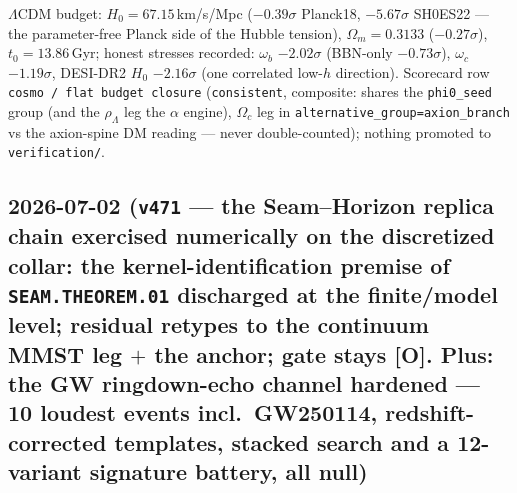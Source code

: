 \documentclass[11pt]{article}
\providecommand{\mO}{\textbf{[O]}}\providecommand{\mX}{\textbf{[X]}}
\begin{document}
\begin{itemize}[leftmargin=1.5em]
$\Lambda$CDM budget: $H_0=67.15$\,km/s/Mpc ($-0.39\sigma$ Planck18, $-5.67\sigma$ SH0ES22 --- the
parameter-free Planck side of the Hubble tension), $\Omega_m=0.3133$ ($-0.27\sigma$), $t_0=13.86$\,Gyr;
honest stresses recorded: $\omega_b$ $-2.02\sigma$ (BBN-only $-0.73\sigma$), $\omega_c$ $-1.19\sigma$,
DESI-DR2 $H_0$ $-2.16\sigma$ (one correlated low-$h$ direction). Scorecard row \texttt{cosmo / flat budget
closure} (\texttt{consistent}, composite: shares the \texttt{phi0\_seed} group (and the $\rho_\Lambda$ leg
the $\alpha$ engine), $\Omega_c$ leg in \texttt{alternative\_group=axion\_branch} vs the axion-spine DM
reading --- never double-counted); nothing promoted to \texttt{verification/}.
\end{itemize}

\subsection*{2026-07-02 (\texttt{v471} --- the Seam--Horizon replica chain exercised numerically on the discretized collar: the kernel-identification premise of \texttt{SEAM.THEOREM.01} discharged at the finite/model level; residual retypes to the continuum MMST leg $+$ the anchor; gate stays \mO. Plus: the GW ringdown-echo channel hardened --- 10 loudest events incl.\ GW250114, redshift-corrected templates, stacked search and a 12-variant signature battery, all null)}
\end{document}
